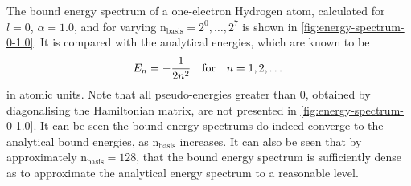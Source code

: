 \documentclass[]{article}
\begin{document}

The bound energy spectrum of a one-electron Hydrogen atom, calculated for
$l = 0$, $\alpha = 1.0$, and for varying
$\mathrm{n_{basis}} = 2^{0}, \dotsc,  2^{7}$ is shown in
\autoref{fig:energy-spectrum-0-1.0}.
It is compared with the analytical energies, which are known to be
\begin{equation*}
  E_{n}
  =
  -
  \dfrac{1}{2 n^{2}}
  \qq{for}
  n = 1, 2, \dotsc
\end{equation*}
in atomic units.
Note that all pseudo-energies greater than 0, obtained by diagonalising the
Hamiltonian matrix, are not presented in \autoref{fig:energy-spectrum-0-1.0}.
It can be seen the bound energy spectrums do indeed converge to the analytical
bound energies, as $\mathrm{n_{basis}}$ increases.
It can also be seen that by approximately $\mathrm{n_{basis}} = 128$, that the
bound energy spectrum is sufficiently dense as to approximate the analytical
energy spectrum to a reasonable level.
\end{document}
